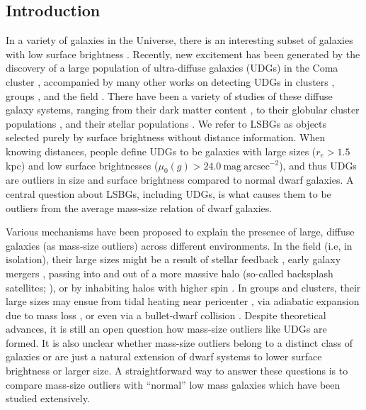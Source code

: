 \documentclass[twocolumn,astrosymb,twocolappendix]{aastex631}
\newcommand{\sbunit}{\mathrm{mag\ arcsec}^{-2}}
\newcommand{\sbcen}{\mu_{0}(g)}
\begin{document}
\begin{CJK*}{UTF8}{gbsn}
\section{Introduction} \label{sec:intro}
In a variety of galaxies in the Universe, there is an interesting subset of galaxies with low surface brightness \citep[dubbed low surface brightness galaxies or LSBGs, e.g.,][]{Sandage1984,Caldwell1987,Impey1988,McGaugh1995,Dalcanton1997a}. Recently, new excitement has been generated by the discovery of a large population of ultra-diffuse galaxies (UDGs) in the Coma cluster \citep{vanDokkum2015}, accompanied by many other works on detecting UDGs in clusters \citep[e.g.,][]{Koda2015,Mihos2015,Yagi2016,vdBurg2016,vdBurg2017,Lee2017,ManceraPina2018,Zaritsky2019,Danieli2019}, groups \citep[e.g.,][]{Roman2017b,Greco2018,SAGA-II,CarlstenELVES2022}, and the field \citep[e.g.,][]{Leisman2017,Roman2019,Prole2019,Tanoglidis2021,Kadowaki2021}. There have been a variety of studies of these diffuse galaxy systems, ranging from their dark matter content \citep[e.g.,][]{Mowla2017,vanDokkum2018,vanDokkum2019,Danieli2019DF2,Wasserman2019,Keim2022}, to their globular cluster populations \citep[e.g.,][]{vanDokkum2017,Somalwar2020,Forbes2020,Danieli2022,Gannon2022,vanDokkum2022GC}, and their stellar populations \citep[e.g.,][]{Gu2018,Ferre-Mateu2018,Pandya2018,Villaume2022}. We refer to LSBGs as objects selected purely by surface brightness without distance information. When knowing distances, people define UDGs to be galaxies with large sizes ($r_e > 1.5$ kpc) and low surface brightnesses ($\sbcen > 24.0\ \sbunit$), and thus UDGs are outliers in size and surface brightness compared to normal dwarf galaxies. A central question about LSBGs, including UDGs, is what causes them to be outliers from the average mass-size relation of dwarf galaxies.

Various mechanisms have been proposed to explain the presence of large, diffuse galaxies (as mass-size outliers) across different environments. In the field (i.e, in isolation), their large sizes might be a result of stellar feedback \citep{DiCintio2017,Chan2018}, early galaxy mergers \citep{Wright2021}, passing into and out of a more massive halo (so-called backsplash satellites; \citealt{Benavides2021}), or by inhabiting halos with higher spin \citep{Dalcanton1997,Amorisco2016,Liao2019,Benavides2022}. In groups and clusters, their large sizes may ensue from tidal heating near pericenter \citep{Jiang2019}, via adiabatic expansion due to mass loss \citep{Tremmel2020}, or even via a bullet-dwarf collision \citep{vandokkum2022Nat,vanDokkum2022GC}. Despite theoretical advances, it is still an open question how mass-size outliers like UDGs are formed. It is also unclear whether mass-size outliers belong to a distinct class of galaxies or are just a natural extension of dwarf systems to lower surface brightness or larger size. A straightforward way to answer these questions is to compare mass-size outliers with ``normal'' low mass galaxies which have been studied extensively. 


\end{CJK*}
\end{document}
